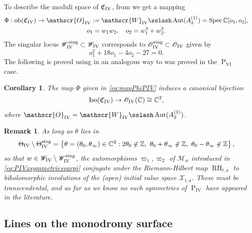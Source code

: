 \documentclass[a4paper,reqno]{amsart}
\numberwithin{equation}{section}
\newcommand{\Z}{\mathbb{Z}}
\newcommand{\C}{\mathbb{C}}
\newcommand{\pain}[1]{\operatorname{P}_{\mathrm{#1}}}
\DeclareMathOperator{\Spec}{Spec}
\DeclareMathOperator{\Aut}{Aut}
\newtheorem{remark}[theorem]{Remark}
\newtheorem{corollary}[theorem]{Corollary}
\numberwithin{equation}{section}
\begin{document}
To describe the moduli space of $\mathfrak{C}_{\rm{IV}}$, from  we get a mapping 
\begin{equation} \label{eq:mapPhiPIV}
\begin{gathered}
    \Phi : \operatorname{ob}(\mathfrak{C}_{\rm{IV}})\to \mathscr{O}_{\rm{IV}}:= \mathscr{W}_{\rm{IV}}\sslash \Aut(A_2^{(1)}) = \Spec \C[o_1,o_2], \\
    o_1 = w_1 w_2, \quad o_2 = w_1^3 + w_2^3. 
\end{gathered}
\end{equation}
The singular locus $\mathscr{W}_{\rm{IV}}^{\operatorname{sing}}\subset \mathscr{W}_{\rm{IV}}$ corresponds to $\mathscr{O}_{\rm{IV}}^{\operatorname{sing}}\subset\mathscr{O}_{\rm{IV}}$ given by 
$$ o_1^2+18 o_1 - 4 o_2 -27 = 0.$$
The following is proved using  in an analogous way to  was proved in the $\pain{VI}$ case.
\begin{corollary} \label{cor:modulispacePIV}
    The map $\Phi$ given in \eqref{eq:mapPhiPIV} induces a canonical bijection 
    $$\operatorname{Iso}(\mathfrak{C}_{\rm{IV}}) \to \mathscr{O}_{\rm{IV}}(\C)\cong\C^2,$$
    where $\mathscr{O}_{\rm{IV}} = \mathscr{W}_{\rm{IV}} \sslash \operatorname{Aut}(A_2^{(1)})$.
\end{corollary}




\begin{remark} \label{rem:mysterysymmetryPIV}
    As long as $\theta$ lies in 
        $$\Theta_{\rm{IV}}\setminus \Theta_{\rm{IV}}^{\operatorname{sing}} = \left\{ \theta = (\theta_0,\theta_{\infty})\in \C^2 : 2\theta_0\not\in  \Z, \,\,\theta_0+\theta_{\infty}\not\in \Z, \,\,\theta_0-\theta_{\infty}\not\in \Z \right\},$$
so that $w\in \mathscr{W}_{\rm{IV}}\setminus \mathscr{W}_{\rm{IV}}^{\operatorname{sing}}$, the automorphisms $\varpi_1,\varpi_2$ of $\mathcal{M}_w$ introduced in \cref{eq:PIVxsymmetriesvarpi} conjugate under the Riemann-Hilbert map $\operatorname{RH}_{t,a}$ to biholomorphic involutions of the (open) initial value space $\mathcal{X}_{t,a}$.
These must be transcendental, and as far as we know no such symmetries of $\pain{IV}$ have appeared in the literature.
\end{remark}

\subsection{Lines on the monodromy surface}
\end{document}
